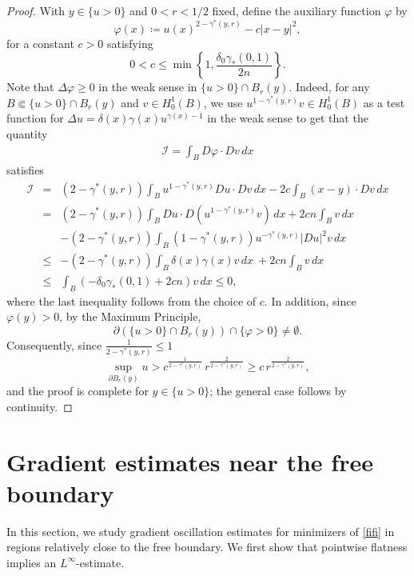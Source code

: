 \documentclass[reqno,11pt]{amsart}
\newcommand{\1}{\mathds{1}}
\numberwithin{equation}{section}
\begin{document}
\begin{proof}
With $y \in \{u>0\}$ and $0 < r < 1/2$ fixed, define the auxiliary function $\varphi$ by
$$
	\varphi(x)\coloneqq u(x)^{2-\gamma^\ast(y,r)}-c|x-y|^2,
$$
for a constant $c>0$ satisfying
$$
	0 < c \leq \min \left\{ 1, \frac{\delta_0 \gamma_\ast (0,1) }{2n} \right\}.
$$
Note that $\Delta \varphi \geq 0$ in the weak sense in $\{u>0\} \cap B_r(y)$. Indeed, for any $B \Subset \{u>0\} \cap B_r(y)$ and $v \in H^1_0(B)$, we use $u^{1-\gamma^{\ast}(y,r)} v \in H^1_0(B)$ as a test function for $\Delta u = \delta(x)\gamma(x)u^{\gamma(x)-1}$ in the weak sense to get that the quantity
\begin{eqnarray*}
	\mathcal{I} = \int_B D\varphi \cdot Dv\,dx
\end{eqnarray*}
satisfies
\begin{eqnarray*}
	\mathcal{I} & = & (2-\gamma^\ast(y,r))\int_B u^{1-\gamma^\ast(y,r)} Du \cdot Dv\,dx - 2c \int_B (x-y) \cdot Dv\, dx\\
	 &= & (2-\gamma^\ast(y,r))\int_B Du \cdot D\left(u^{1-\gamma^\ast(y,r)} v\right)\,dx + 2cn \int_B v\, dx\\
	 & &  -(2-\gamma^\ast(y,r))\int_B(1-\gamma^{\ast}(y,r)) u^{-\gamma^{\ast}(y,r)}|Du|^2 v\,dx
	 \\
	  &\leq & -(2-\gamma^\ast(y,r))\int_B \delta(x)\gamma(x) v \,dx\  + 2cn \int_B v\, dx\\
	  &\leq & \int_B \left(-\delta_0 \gamma_{\ast}(0,1) + 2cn\right) v\, dx \leq 0,
\end{eqnarray*}
where the last inequality follows from the choice of $c$. In addition, since $\varphi(y)>0$, by the Maximum Principle, 
$$
	 \partial\left(\{u>0\} \cap B_r(y)\right) \cap \{\varphi>0\} \not = \emptyset.
$$
Consequently, since ${\frac{1}{2-\gamma^\ast(y,r)}} \leq 1$
$$
    \sup_{\partial B_r(y)} u > c^{{\frac{1}{2-\gamma^\ast(y,r)}}} \, r^{{\frac{2}{2-\gamma^\ast(y,r)}}}\geq c \, r^{{\frac{2}{2-\gamma^\ast(y,r)}}},
$$
and the proof is complete for $y \in \{u>0\}$; the general case follows by continuity.
\end{proof}

\section{Gradient estimates near the free boundary} \label{sct-grad}

In this section, we study gradient oscillation estimates for minimizers of \eqref{fifi} in regions relatively close to the free boundary. We first show that pointwise flatness implies an $ L^\infty$-estimate.
\end{document}
